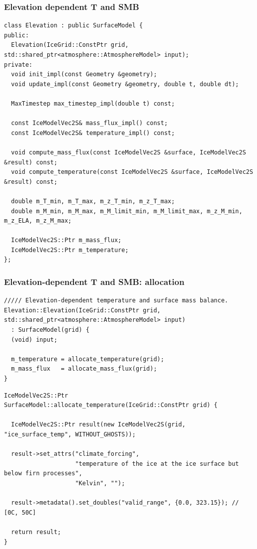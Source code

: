 \documentclass[hide notes,intlimits]{beamer}
\begin{document}
\begin{frame}[fragile]
  \frametitle{Elevation dependent T and SMB}
\begin{lstlisting}
class Elevation : public SurfaceModel {
public:
  Elevation(IceGrid::ConstPtr grid, std::shared_ptr<atmosphere::AtmosphereModel> input);
private:
  void init_impl(const Geometry &geometry);
  void update_impl(const Geometry &geometry, double t, double dt);

  MaxTimestep max_timestep_impl(double t) const;

  const IceModelVec2S& mass_flux_impl() const;
  const IceModelVec2S& temperature_impl() const;

  void compute_mass_flux(const IceModelVec2S &surface, IceModelVec2S &result) const;
  void compute_temperature(const IceModelVec2S &surface, IceModelVec2S &result) const;

  double m_T_min, m_T_max, m_z_T_min, m_z_T_max;
  double m_M_min, m_M_max, m_M_limit_min, m_M_limit_max, m_z_M_min, m_z_ELA, m_z_M_max;

  IceModelVec2S::Ptr m_mass_flux;
  IceModelVec2S::Ptr m_temperature;
};
\end{lstlisting}
\end{frame}

\begin{frame}[fragile]
  \frametitle{Elevation-dependent T and SMB: allocation}

\begin{lstlisting}
///// Elevation-dependent temperature and surface mass balance.
Elevation::Elevation(IceGrid::ConstPtr grid, std::shared_ptr<atmosphere::AtmosphereModel> input)
  : SurfaceModel(grid) {
  (void) input;

  m_temperature = allocate_temperature(grid);
  m_mass_flux   = allocate_mass_flux(grid);
}
\end{lstlisting}

\begin{lstlisting}
IceModelVec2S::Ptr SurfaceModel::allocate_temperature(IceGrid::ConstPtr grid) {

  IceModelVec2S::Ptr result(new IceModelVec2S(grid, "ice_surface_temp", WITHOUT_GHOSTS));

  result->set_attrs("climate_forcing",
                    "temperature of the ice at the ice surface but below firn processes",
                    "Kelvin", "");

  result->metadata().set_doubles("valid_range", {0.0, 323.15}); // [0C, 50C]

  return result;
}
\end{lstlisting}
\end{frame}
\end{document}
